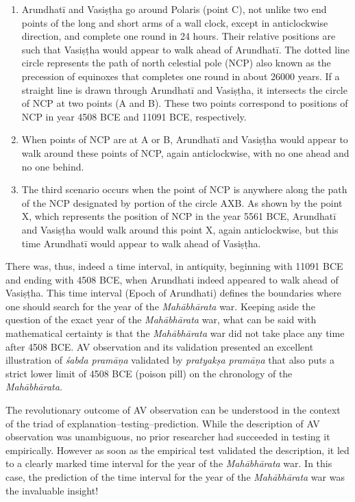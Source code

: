 \begin{enumerate}
\item Arundhatī and Vasiṣṭha go around Polaris (point C), not unlike two end points of the long and short arms of a wall clock, except in anticlockwise direction, and complete one round in 24 hours. Their relative positions are such that Vasiṣṭha would appear to walk ahead of Arundhatī. The dotted line circle represents the path of north celestial pole (NCP) also known as the precession of equinoxes that completes one round in about 26000 years. If a straight line is drawn through Arundhatī and Vasiṣṭha, it intersects the circle of NCP at two points (A and B). These two points correspond to positions of NCP in year 4508 BCE and 11091 BCE, respectively.

 \item When points of NCP are at A or B, Arundhatī and Vasiṣṭha would appear to walk around these points of NCP, again anticlockwise, with no one ahead and no one behind.

 \item The third scenario occurs when the point of NCP is anywhere along the path of the NCP designated by portion of the circle AXB. As shown by the point X, which represents the position of NCP in the year 5561 BCE, Arundhatī and Vasiṣṭha would walk around this point X, again anticlockwise, but this time Arundhatī would appear to walk ahead of Vasiṣṭha.

\end{enumerate}

There was, thus, indeed a time interval, in antiquity, beginning with 11091 BCE and ending with 4508 BCE, when Arundhati indeed appeared to walk ahead of Vasiṣṭha. This time interval (Epoch of Arundhati) defines the boundaries where one should search for the year of the \textit{Mahābhārata} war. Keeping aside the question of the exact year of the \textit{Mahābhārata} war, what can be said with mathematical certainty is that the \textit{Mahābhārata} war did not take place any time after 4508 BCE. AV observation and its validation presented an excellent illustration of \textit{śabda pramāṇa} validated by \textit{pratyakṣa pramāṇa} that also puts a strict lower limit of 4508 BCE (poison pill) on the chronology of the \textit{Mahābhārata}.

The revolutionary outcome of AV observation can be understood in the context of the triad of explanation–testing–prediction. While the description of AV observation was unambiguous, no prior researcher had succeeded in testing it empirically. However as soon as the empirical test validated the description, it led to a clearly marked time interval for the year of the \textit{Mahābhārata} war. In this case, the prediction of the time interval for the year of the \textit{Mahābhārata} war was the invaluable insight!

